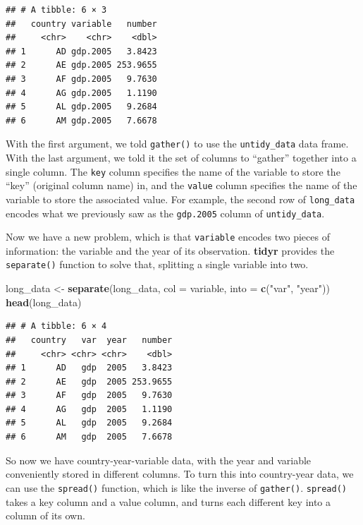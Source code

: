 \documentclass[12pt,oneside,openany]{book}
\newenvironment{Shaded}{\begin{snugshade}}{\end{snugshade}}
\newcommand{\KeywordTok}[1]{\textcolor[rgb]{0.13,0.29,0.53}{\textbf{{#1}}}}
\newcommand{\DataTypeTok}[1]{\textcolor[rgb]{0.13,0.29,0.53}{{#1}}}
\newcommand{\StringTok}[1]{\textcolor[rgb]{0.31,0.60,0.02}{{#1}}}
\newcommand{\NormalTok}[1]{{#1}}
\begin{document}
\begin{verbatim}
## # A tibble: 6 × 3
##   country variable   number
##     <chr>    <chr>    <dbl>
## 1      AD gdp.2005   3.8423
## 2      AE gdp.2005 253.9655
## 3      AF gdp.2005   9.7630
## 4      AG gdp.2005   1.1190
## 5      AL gdp.2005   9.2684
## 6      AM gdp.2005   7.6678
\end{verbatim}

With the first argument, we told \texttt{gather()} to use the
\texttt{untidy\_data} data frame. With the last argument, we told it the
set of columns to ``gather'' together into a single column. The
\texttt{key} column specifies the name of the variable to store the
``key'' (original column name) in, and the \texttt{value} column
specifies the name of the variable to store the associated value. For
example, the second row of \texttt{long\_data} encodes what we
previously saw as the \texttt{gdp.2005} column of \texttt{untidy\_data}.

Now we have a new problem, which is that \texttt{variable} encodes two
pieces of information: the variable and the year of its observation.
\textbf{tidyr} provides the \texttt{separate()} function to solve that,
splitting a single variable into two.

\begin{Shaded}
\begin{Highlighting}[]
\NormalTok{long_data <-}\StringTok{ }\KeywordTok{separate}\NormalTok{(long_data,}
                      \DataTypeTok{col =} \NormalTok{variable,}
                      \DataTypeTok{into =} \KeywordTok{c}\NormalTok{(}\StringTok{"var"}\NormalTok{, }\StringTok{"year"}\NormalTok{))}
\KeywordTok{head}\NormalTok{(long_data)}
\end{Highlighting}
\end{Shaded}

\begin{verbatim}
## # A tibble: 6 × 4
##   country   var  year   number
##     <chr> <chr> <chr>    <dbl>
## 1      AD   gdp  2005   3.8423
## 2      AE   gdp  2005 253.9655
## 3      AF   gdp  2005   9.7630
## 4      AG   gdp  2005   1.1190
## 5      AL   gdp  2005   9.2684
## 6      AM   gdp  2005   7.6678
\end{verbatim}

So now we have country-year-variable data, with the year and variable
conveniently stored in different columns. To turn this into country-year
data, we can use the \texttt{spread()} function, which is like the
inverse of \texttt{gather()}. \texttt{spread()} takes a key column and a
value column, and turns each different key into a column of its own.
\end{document}

